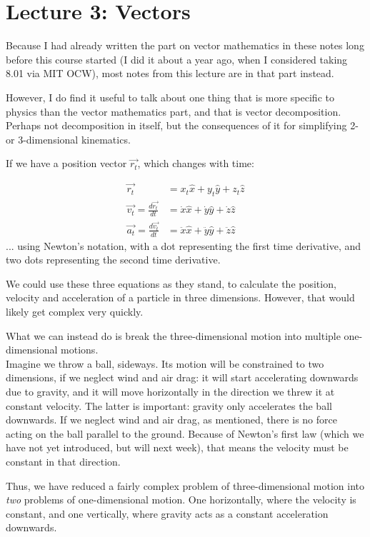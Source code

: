 \documentclass[12pt,a4paper]{report}
\begin{document}
\section{Lecture 3: Vectors}

Because I had already written the part on vector mathematics in these notes long before this course started (I did it about a year ago, when I considered taking 8.01 via MIT OCW), most notes from this lecture are in that part instead.

However, I do find it useful to talk about one thing that is more specific to physics than the vector mathematics part, and that is vector decomposition. Perhaps not decomposition in itself, but the consequences of it for simplifying 2- or 3-dimensional kinematics.

If we have a position vector $\vec{r_t}$, which changes with time:

\begin{align}
 \vec{r_t} &= x_t \hat{x} + y_t \hat{y} + z_t \hat{z} \\
 \vec{v_t} = \frac{d\vec{r_t}}{dt} &= \dot{x} \hat{x} + \dot{y} \hat{y} + \dot{z} \hat{z}\\
 \vec{a_t} = \frac{d\vec{v_t}}{dt} &= \ddot{x} \hat{x} + \ddot{y} \hat{y} + \ddot{z} \hat{z}
\end{align}
... using Newton's notation, with a dot representing the first time derivative, and two dots representing the second time derivative.

We could use these three equations as they stand, to calculate the position, velocity and acceleration of a particle in three dimensions. However, that would likely get complex very quickly.

What we can instead do is break the three-dimensional motion into multiple one-dimensional motions.\\
Imagine we throw a ball, sideways. Its motion will be constrained to two dimensions, if we neglect wind and air drag: it will start accelerating downwards due to gravity, and it will move horizontally in the direction we threw it at constant velocity. The latter is important: gravity only accelerates the ball downwards. If we neglect wind and air drag, as mentioned, there is no force acting on the ball parallel to the ground. Because of Newton's first law (which we have not yet introduced, but will next week), that means the velocity must be constant in that direction.

Thus, we have reduced a fairly complex problem of three-dimensional motion into \emph{two} problems of one-dimensional motion. One horizontally, where the velocity is constant, and one vertically, where gravity acts as a constant acceleration downwards.
\end{document}
